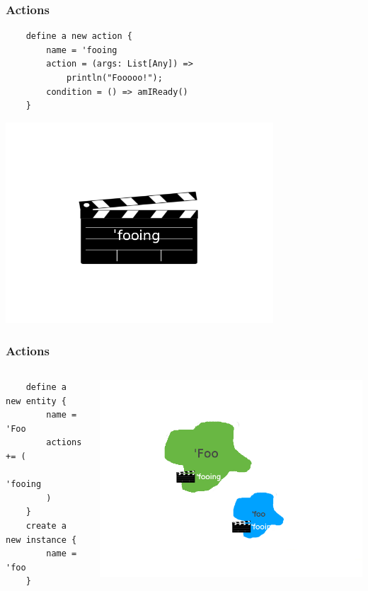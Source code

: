 \documentclass{beamer}
\begin{document}
\begin{frame}[fragile]
    \frametitle{Actions}
    \begin{lstlisting}
    define a new action {
        name = 'fooing
        action = (args: List[Any]) =>
            println("Fooooo!");
        condition = () => amIReady()
    }
    \end{lstlisting}
    \includegraphics[width=10cm]{fooing}
\end{frame}

\begin{frame}[fragile]
    \frametitle{Actions}
    \begin{columns}[T]
    \begin{column}[T]{5cm}
    \begin{lstlisting}
    define a new entity {
        name = 'Foo
        actions += (
            'fooing
        )
    }
    create a new instance {
        name = 'foo
    }
    \end{lstlisting}
    \end{column}
    \begin{column}[T]{4cm}
    \includegraphics[scale=0.4, trim=8cm 0cm 8cm 0cm]{foo-fooing}
    \end{column}
    \end{columns}
\end{frame}
\end{document}
